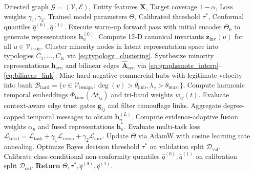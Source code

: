 \begin{algorithm}[htbp]
\caption[C-STGB Unified Multi-Stage Training Pipeline]{C-STGB Unified Multi-Stage Training Pipeline}
\label{alg:cstgb_training}
\begin{algorithmic}[1]
\Require Directed graph $\mathcal{G}=(\mathcal{V}, \mathcal{E})$, Entity features $\mathbf{X}$, Target coverage $1-\alpha$, Loss weights $\gamma_1, \gamma_2$.
\Ensure Trained model parameters $\Theta$, Calibrated threshold $\tau^*$, Conformal quantiles $\hat{q}^{(0)}, \hat{q}^{(1)}$.
\State Execute warm-up forward pass with initial encoder $\Theta_0$ to generate representations $\mathbf{h}_u^{(0)}$.
\State Compute 12-D canonical invariants $\mathbf{z}_{\text{inv}}(u)$ for all $u \in \mathcal{V}_{\text{train}}$.
\State Cluster minority nodes in latent representation space into typologies $C_1, \dots, C_K$ via \eqref{eq:typology_clustering}.
\State Synthesize minority representations $\mathbf{h}_{\text{syn}}$ and bilinear edges $\mathbf{\hat{A}}_{\text{syn}}$ via \eqref{eq:graphsmote_interp}--\eqref{eq:bilinear_link}.
\State Mine hard-negative commercial hubs with legitimate velocity into bank $\mathcal{B}_{\text{hard}} = \{v \in \mathcal{V}_{\text{benign}} : \deg(v) > \theta_{\text{hub}}, \lambda_v > \theta_{\text{burst}}\}$.
    \State Compute harmonic temporal embeddings $\Phi_{\text{time}}(\Delta t_{ij})$ and tri-band weights $w_{ij}(t)$.
    \State Evaluate context-aware edge trust gates $\mathbf{g}_{ij}$ and filter camouflage links.
    \State Aggregate degree-capped temporal messages to obtain $\mathbf{h}_u^{(L)}$.
    \State Compute evidence-adaptive fusion weights $\alpha_u$ and fused representations $\mathbf{h}_u^*$.
    \State Evaluate multi-task loss $\mathcal{L}_{\text{total}} = \mathcal{L}_{\text{task}} + \gamma_1 \mathcal{L}_{\text{recon}} + \gamma_2 \mathcal{L}_{\text{aux}}$.
    \State Update $\Theta$ via AdamW with cosine learning rate annealing.
\EndFor
\State Optimize Bayes decision threshold $\tau^*$ on validation split $\mathcal{D}_{\text{val}}$.
\State Calibrate class-conditional non-conformity quantiles $\hat{q}^{(0)}, \hat{q}^{(1)}$ on calibration split $\mathcal{D}_{\text{cal}}$.
\State \textbf{Return} $\Theta, \tau^*, \hat{q}^{(0)}, \hat{q}^{(1)}$.
\end{algorithmic}
\end{algorithm}


